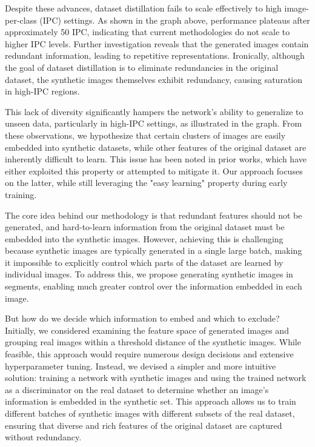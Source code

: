 \documentclass{article}
\theoremstyle{plain}
\theoremstyle{definition}
\theoremstyle{remark}
\begin{document}
Despite these advances, dataset distillation fails to scale effectively to high image-per-class (IPC) settings. As shown in the graph above, performance plateaus after approximately 50 IPC, indicating that current methodologies do not scale to higher IPC levels. Further investigation reveals that the generated images contain redundant information, leading to repetitive representations. Ironically, although the goal of dataset distillation is to eliminate redundancies in the original dataset, the synthetic images themselves exhibit redundancy, causing saturation in high-IPC regions.

This lack of diversity significantly hampers the network's ability to generalize to unseen data, particularly in high-IPC settings, as illustrated in the graph. From these observations, we hypothesize that certain clusters of images are easily embedded into synthetic datasets, while other features of the original dataset are inherently difficult to learn. This issue has been noted in prior works, which have either exploited this property or attempted to mitigate it. Our approach focuses on the latter, while still leveraging the "easy learning" property during early training.

The core idea behind our methodology is that redundant features should not be generated, and hard-to-learn information from the original dataset must be embedded into the synthetic images. However, achieving this is challenging because synthetic images are typically generated in a single large batch, making it impossible to explicitly control which parts of the dataset are learned by individual images. To address this, we propose generating synthetic images in segments, enabling much greater control over the information embedded in each image.

But how do we decide which information to embed and which to exclude? Initially, we considered examining the feature space of generated images and grouping real images within a threshold distance of the synthetic images. While feasible, this approach would require numerous design decisions and extensive hyperparameter tuning. Instead, we devised a simpler and more intuitive solution: training a network with synthetic images and using the trained network as a discriminator on the real dataset to determine whether an image's information is embedded in the synthetic set. This approach allows us to train different batches of synthetic images with different subsets of the real dataset, ensuring that diverse and rich features of the original dataset are captured without redundancy.
\end{document}
